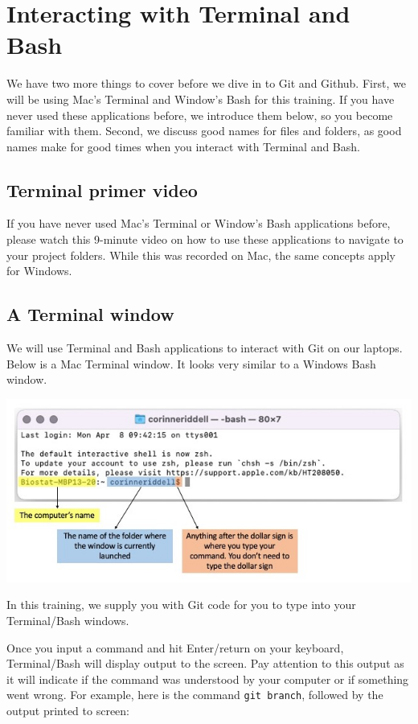\documentclass[
]{book}
\begin{document}
\chapter{Interacting with Terminal and Bash}\label{interacting-with-terminal-and-bash}

We have two more things to cover before we dive in to Git and Github. First,
we will be using Mac's Terminal and Window's Bash for this training. If you
have never used these applications before, we introduce them below, so you
become familiar with them. Second, we discuss good names for files and folders,
as good names make for good times when you interact with Terminal and Bash.

\section{Terminal primer video}\label{terminal-primer-video}

If you have never used Mac's Terminal or Window's Bash applications before, please
watch this 9-minute video on how to use these applications to navigate to your
project folders. While this was recorded on Mac, the same concepts apply for Windows.

\section{A Terminal window}\label{a-terminal-window}

We will use Terminal and Bash applications to interact with Git on our laptops.
Below is a Mac Terminal window. It looks very similar to a Windows Bash window.

\includegraphics[width=1\linewidth]{./figures/Terminal-explainer-1}

In this training, we supply you with Git code for you to type into
your Terminal/Bash windows.

Once you input a command and hit Enter/return on
your keyboard, Terminal/Bash will display output to the screen. Pay attention
to this output as it will indicate if the command was understood by your
computer or if something went wrong. For example, here is the command
\texttt{git\ branch}, followed by the output printed to screen:
\end{document}
